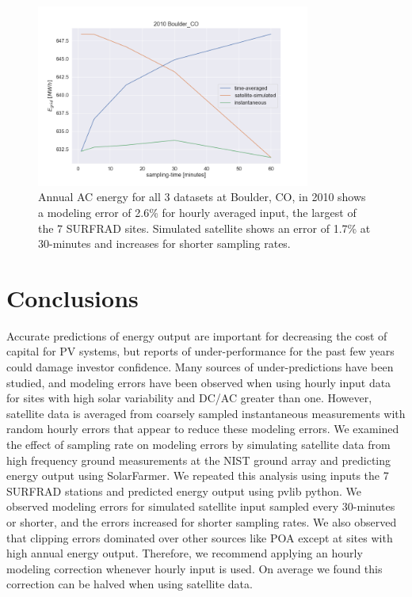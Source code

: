 \documentclass[conference]{IEEEtran}
\begin{document}
\begin{figure}[htbp]
\centerline{\includegraphics[width=9cm]{analysis/tbl2010.png}}
\caption{Annual AC energy for all 3 datasets at Boulder, CO, in 2010 shows a modeling error of 2.6\% for hourly averaged input, the largest of the 7 SURFRAD sites. Simulated satellite shows an error of 1.7\% at 30-minutes and increases for shorter sampling rates.}
\label{fig:tbl2010}
\end{figure}

\section{Conclusions}
Accurate predictions of energy output are important for decreasing the cost of capital for PV systems, but reports of under-performance for the past few years could damage investor confidence. Many sources of under-predictions have been studied, and modeling errors have been observed when using hourly input data for sites with high solar variability and DC/AC greater than one. However, satellite data is averaged from coarsely sampled instantaneous measurements with random hourly errors that appear to reduce these modeling errors. We examined the effect of sampling rate on modeling errors by simulating satellite data from high frequency ground measurements at the NIST ground array and predicting energy output using SolarFarmer. We repeated this analysis using inputs the 7 SURFRAD stations and predicted energy output using pvlib python. We observed modeling errors for simulated satellite input sampled every 30-minutes or shorter, and the errors increased for shorter sampling rates. We also observed that clipping errors dominated over other sources like POA except at sites with high annual energy output. Therefore, we recommend applying an hourly modeling correction whenever hourly input is used. On average we found this correction can be halved when using satellite data.



\end{document}
